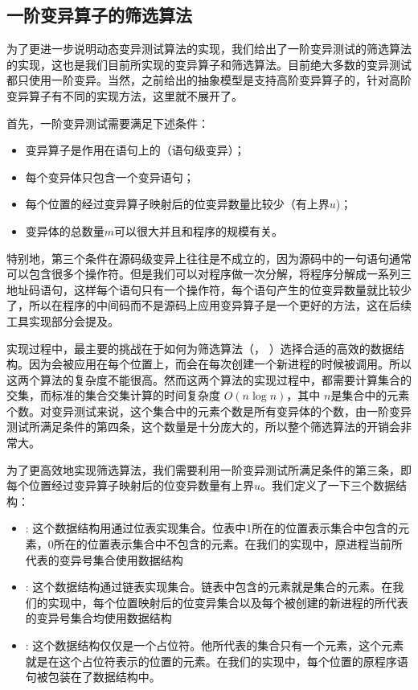 \documentclass[nofonts]{ctexrep}
\begin{document}
\subsection{一阶变异算子的筛选算法}
为了更进一步说明动态变异测试算法的实现，我们给出了一阶变异测试的筛选算法的实现，这也是我们目前所实现的变异算子和筛选算法。目前绝大多数的变异测试都只使用一阶变异。当然，之前给出的抽象模型是支持高阶变异算子的，针对高阶变异算子有不同的实现方法，这里就不展开了。

首先，一阶变异测试需要满足下述条件：
\begin{itemize}
\item
变异算子是作用在语句上的（语句级变异）；
\item
每个变异体只包含一个变异语句；
\item
每个位置的经过变异算子映射后的位变异数量比较少（有上界$u$)；
\item
变异体的总数量$m$可以很大并且和程序的规模有关。
\end{itemize}

特别地，第三个条件在源码级变异上往往是不成立的，因为源码中的一句语句通常可以包含很多个操作符。但是我们可以对程序做一次分解，将程序分解成一系列三地址码语句，这样每个语句只有一个操作符，每个语句产生的位变异数量就比较少了，所以在程序的中间码而不是源码上应用变异算子是一个更好的方法，这在后续工具实现部分会提及。

实现过程中，最主要的挑战在于如何为筛选算法（\filterv ， \filterm ）选择合适的高效的数据结构。因为\filterv 会被应用在每个位置上，而\filterm 会在每次创建一个新进程的时候被调用。所以这两个算法的复杂度不能很高。然而这两个算法的实现过程中，都需要计算集合的交集，而标准的集合交集计算的时间复杂度 $O(n\log{n})$，其中 $n$是集合中的元素个数。对变异测试来说，这个集合中的元素个数是所有变异体的个数，由一阶变异测试所满足条件的第四条，这个数量是十分庞大的，所以整个筛选算法的开销会非常大。

为了更高效地实现筛选算法，我们需要利用一阶变异测试所满足条件的第三条，即每个位置经过变异算子映射后的位变异数量有上界$u$。我们定义了一下三个数据结构：
\begin{itemize}

\item \VectorSet: 这个数据结构用通过位表实现集合。位表中1所在的位置表示集合中包含的元素，0所在的位置表示集合中不包含的元素。在我们的实现中，原进程当前所代表的变异号集合使用\VectorSet 数据结构

\item \ListSet: 这个数据结构通过链表实现集合。链表中包含的元素就是集合的元素。在我们的实现中，每个位置映射后的位变异集合以及每个被创建的新进程的所代表的变异号集合均使用\ListSet 数据结构

\item \DefaultSet: 这个数据结构仅仅是一个占位符。他所代表的集合只有一个元素，这个元素就是在这个占位符表示的位置的元素。在我们的实现中，每个位置的原程序语句被包装在了\DefaultSet 数据结构中。

\end{itemize}
\end{document}
